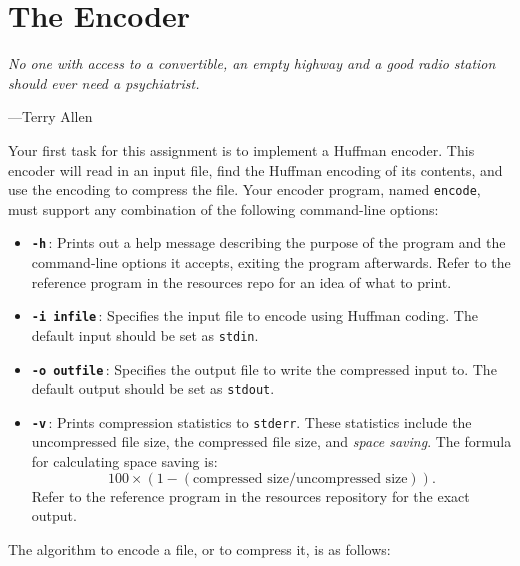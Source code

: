 \section{The Encoder}
\textwidth
\epigraph{\emph{No one with access to a convertible, an empty highway and a good radio station should ever need a psychiatrist.}}{---Terry Allen}

\noindent
Your first task for this assignment is to implement a Huffman encoder.
This encoder will read in an input file, find the Huffman encoding of
its contents, and use the encoding to compress the file. Your encoder
program, named \texttt{encode}, must support any combination of the
following command-line options:

\begin{itemize}
  \item \textbf{\texttt{-h}}\,: Prints out a help message describing the purpose
    of the program and the command-line options it accepts, exiting the
    program afterwards. Refer to the reference program in the resources
    repo for an idea of what to print.

  \item \textbf{\texttt{-i infile}}\,: Specifies the input file to encode using
    Huffman coding. The default input should be set as \texttt{stdin}.

  \item \textbf{\texttt{-o outfile}}\,: Specifies the output file to
    write the compressed input to. The default output should be set as
    \texttt{stdout}.

  \item \textbf{\texttt{-v}}\,: Prints compression statistics to
    \texttt{stderr}. These statistics include the uncompressed file
    size, the compressed file size, and \emph{space saving}. The formula
    for calculating space saving is:
    \[
        100 \times (1 - (\text{compressed size} / \text{uncompressed
        size})).
    \]
    Refer to the reference program in the resources repository for the
    exact output.
\end{itemize}

\noindent The algorithm to encode a file, or to compress it, is as follows:

